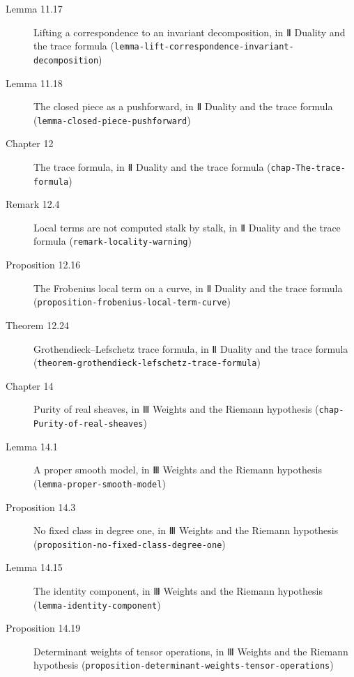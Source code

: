 \documentclass[11pt]{article}
\newcommand{\bpslug}[1]{\texttt{#1}}
\begin{document}
\begin{description}
\item[Lemma 11.17] Lifting a correspondence to an invariant decomposition, in Ⅱ Duality and the trace formula (\bpslug{lemma-{}\allowbreak{}lift-{}\allowbreak{}correspondence-{}\allowbreak{}invariant-{}\allowbreak{}decomposition})
\item[Lemma 11.18] The closed piece as a pushforward, in Ⅱ Duality and the trace formula (\bpslug{lemma-{}\allowbreak{}closed-{}\allowbreak{}piece-{}\allowbreak{}pushforward})
\item[Chapter 12] The trace formula, in Ⅱ Duality and the trace formula (\bpslug{chap-{}\allowbreak{}The-{}\allowbreak{}trace-{}\allowbreak{}formula})
\item[Remark 12.4] Local terms are not computed stalk by stalk, in Ⅱ Duality and the trace formula (\bpslug{remark-{}\allowbreak{}locality-{}\allowbreak{}warning})
\item[Proposition 12.16] The Frobenius local term on a curve, in Ⅱ Duality and the trace formula (\bpslug{proposition-{}\allowbreak{}frobenius-{}\allowbreak{}local-{}\allowbreak{}term-{}\allowbreak{}curve})
\item[Theorem 12.24] Grothendieck–Lefschetz trace formula, in Ⅱ Duality and the trace formula (\bpslug{theorem-{}\allowbreak{}grothendieck-{}\allowbreak{}lefschetz-{}\allowbreak{}trace-{}\allowbreak{}formula})
\item[Chapter 14] Purity of real sheaves, in Ⅲ Weights and the Riemann hypothesis (\bpslug{chap-{}\allowbreak{}Purity-{}\allowbreak{}of-{}\allowbreak{}real-{}\allowbreak{}sheaves})
\item[Lemma 14.1] A proper smooth model, in Ⅲ Weights and the Riemann hypothesis (\bpslug{lemma-{}\allowbreak{}proper-{}\allowbreak{}smooth-{}\allowbreak{}model})
\item[Proposition 14.3] No fixed class in degree one, in Ⅲ Weights and the Riemann hypothesis (\bpslug{proposition-{}\allowbreak{}no-{}\allowbreak{}fixed-{}\allowbreak{}class-{}\allowbreak{}degree-{}\allowbreak{}one})
\item[Lemma 14.15] The identity component, in Ⅲ Weights and the Riemann hypothesis (\bpslug{lemma-{}\allowbreak{}identity-{}\allowbreak{}component})
\item[Proposition 14.19] Determinant weights of tensor operations, in Ⅲ Weights and the Riemann hypothesis (\bpslug{proposition-{}\allowbreak{}determinant-{}\allowbreak{}weights-{}\allowbreak{}tensor-{}\allowbreak{}operations})
\end{description}
\clearpage{}%
\end{document}
